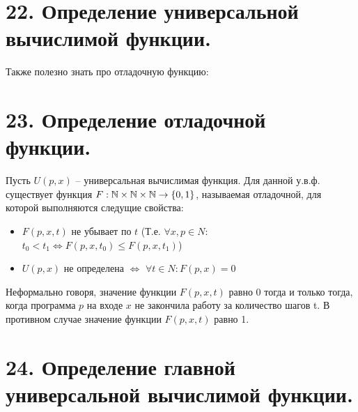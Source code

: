 \section*{22. Определение универсальной вычислимой функции.}


Также полезно знать про отладочную функцию:


\section*{23. Определение отладочной функции.}

Пусть $U(p, x)$ -- универсальная вычислимая функция. Для данной у.в.ф. существует функция $F: \mathbb{N} \times \mathbb{N} \times \mathbb{N} \rightarrow \{0, 1\}$, называемая отладочной, для которой выполняются следущие свойства:
\begin{itemize}
	\item $F(p, x, t)$ не убывает по $t$ (Т.е. $\forall x, p \in N:$ $t_0 < t_1 \Leftrightarrow F(p, x, t_0) \le F(p, x, t_1)$)
	
	\item $U(p, x)$ не определена $\Leftrightarrow$ $\forall t \in N: F(p, x) = 0$
\end{itemize}

Неформально говоря, значение функции $F(p, x, t)$ равно 0 тогда и только тогда, когда программа $p$ на входе $x$ не закончила работу за количество шагов t. В противном случае значение функции 
$F(p, x, t)$ равно 1.

\section*{24. Определение главной универсальной вычислимой функции.}

